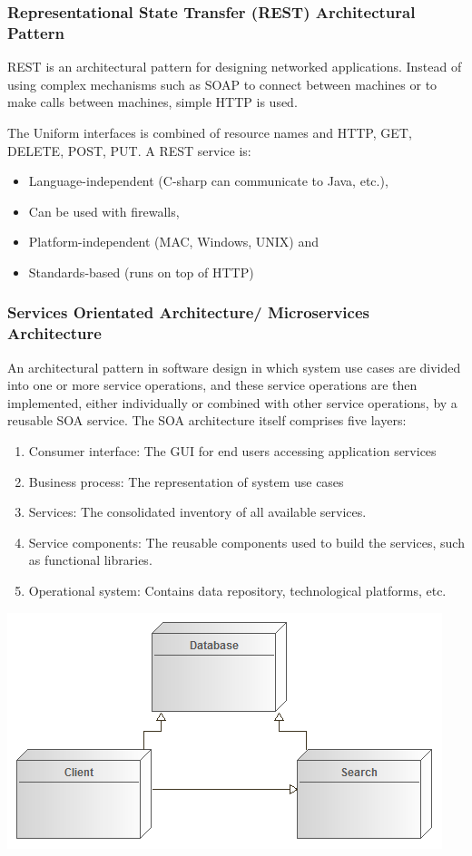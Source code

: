\documentclass[a4paper,10pt]{article}
\begin{document}
	\subsubsection{Representational State Transfer (REST) Architectural Pattern}
	REST is an architectural pattern for designing networked applications. Instead of using complex mechanisms such as SOAP to 	connect between machines or to make calls between machines, simple HTTP is used.

The Uniform interfaces is combined of resource names and HTTP, GET, DELETE, POST, PUT.
A REST service is:
\begin{itemize}
	\item Language-independent (C-sharp can communicate to Java, etc.),
	\item Can be used with firewalls,
	\item Platform-independent (MAC, Windows, UNIX) and
	\item Standards-based (runs on top of HTTP)
\end{itemize}

	\subsubsection{Services Orientated Architecture/ Microservices Architecture}
An architectural pattern in software design in which system use cases are divided into one or more service operations, and these service operations are then implemented, either individually or combined with other service operations, by a reusable SOA service. The SOA architecture itself comprises five layers:
	\begin{enumerate}
		\item Consumer interface: The GUI for end users accessing application services
		\item Business process: The representation of system use cases
		\item Services: The consolidated inventory of all available services.
		\item Service components: The reusable components used to build the services, such as functional libraries.
		\item Operational system: Contains data repository, technological platforms, etc.
	\end{enumerate}
 	\includegraphics[scale=0.5]{service_oriented_architecture_diagram.png}\\
\end{document}

